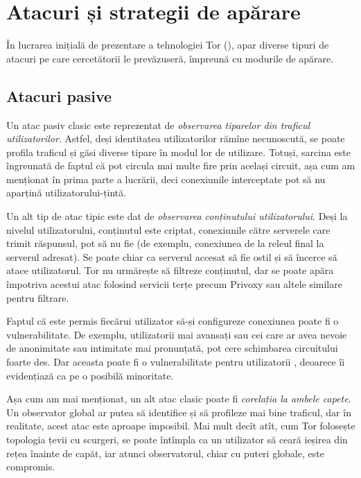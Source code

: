 
\chapter{Atacuri și strategii de apărare}

\indent\indent În lucrarea inițială de prezentare a tehnologiei Tor (\cite{whitepaper}),
apar diverse tipuri de atacuri pe care cercetătorii le prevăzuseră, împreună cu
modurile de apărare.

\section{Atacuri pasive}

\indent\indent Un atac pasiv clasic este reprezentat de \emph{observarea tiparelor %
din traficul utilizatorilor}. Astfel, deși identitatea utilizatorilor rămîne
necunoscută, se poate profila traficul și găsi diverse tipare în modul lor
de utilizare. Totuși, sarcina este îngreunată de faptul că pot circula mai
multe fire prin același circuit, așa cum am menționat în prima parte a lucrării,
deci conexiunile interceptate pot să nu aparțină utilizatorului-țintă.

Un alt tip de atac tipic este dat de \emph{observarea conținutului utilizatorului}.
Deși la nivelul utilizatorului, conținutul este criptat, conexiunile către
serverele care trimit răspunsul, pot să nu fie (de exemplu, conexiunea de
la releul final la serverul adresat). Se poate chiar ca serverul accesat să
fie ostil și să încerce să atace utilizatorul. Tor nu urmărește să filtreze
conținutul, dar se poate apăra împotriva acestui atac folosind servicii terțe
precum Privoxy sau altele similare pentru filtrare.

Faptul că este permis fiecărui utilizator să-și configureze conexiunea poate
fi o vulnerabilitate. De exemplu, utilizatorii mai avansați sau cei care
ar avea nevoie de anonimitate sau intimitate mai pronunțată, pot cere schimbarea
circuitului foarte des. Dar aceasta poate fi o vulnerabilitate pentru utilizatorii
, deoarece îi evidențiază ca pe o posibilă minoritate.

Așa cum am mai menționat, un alt atac clasic poate fi \emph{corelația la ambele capete}.
Un observator global ar putea să identifice și să profileze mai bine traficul,
dar în realitate, acest atac este aproape imposibil. Mai mult decît atît,
cum Tor folosește topologia țevii cu scurgeri, se poate întîmpla ca un utilizator
să ceară ieșirea din rețea înainte de capăt, iar atunci observatorul, chiar cu
puteri globale, este compromis.

